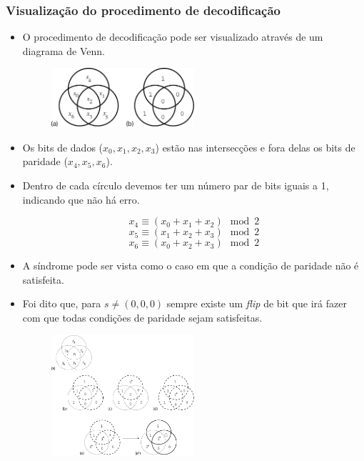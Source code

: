 \begin{frame}[allowframebreaks]
  \frametitle{Visualização do procedimento de decodificação}
  \begin{itemize}
  \item O procedimento de decodificação pode ser visualizado através de um diagrama de Venn.
                \begin{figure}[h!]
                \centering
                \includegraphics[width=0.5\textwidth]{images/venhamm.pdf}
                \label{fig:venhamm}
                \end{figure}

  \item Os bits de dados ($x_0,x_1,x_2,x_3$) estão nas intersecções e fora delas os bits de paridade ($x_4,x_5,x_6$).
  \item Dentro de cada círculo devemos ter um número par de bits iguais a 1, indicando que não há erro.

 	\begin{equation}
	x_4 \equiv ( x_0 + x_1 + x_2 ) \mod 2
	\end{equation}
        \begin{equation}
        x_5 \equiv ( x_1 + x_2 + x_3 ) \mod 2
        \end{equation}
        \begin{equation}
        x_6 \equiv ( x_0 + x_2 + x_3 ) \mod 2
        \end{equation}
  \item A síndrome pode ser vista como o caso em que a condição de paridade não é satisfeita.
  \item Foi dito que, para $s \neq (0,0,0)$ sempre existe um \textit{flip} de bit que irá fazer com que todas condições de paridade 
	sejam satisfeitas.

                \begin{figure}[h!]
                \centering
                \includegraphics[width=0.5\textwidth]{images/venhamm2.pdf}
                \label{fig:venhamm2}
                \end{figure}


\end{itemize}
\end{frame}
